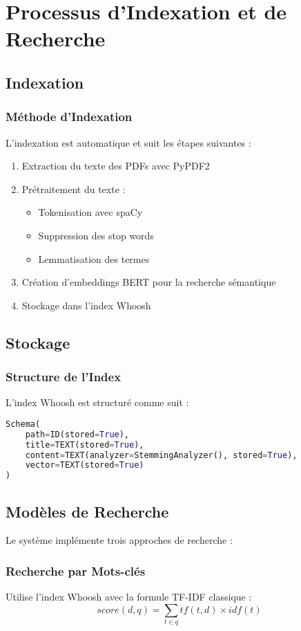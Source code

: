 \documentclass[12pt,a4paper]{article}
\begin{document}
\section{Processus d'Indexation et de Recherche}

\subsection{Indexation}
\subsubsection{Méthode d'Indexation}
L'indexation est automatique et suit les étapes suivantes :
\begin{enumerate}
    \item Extraction du texte des PDFs avec PyPDF2
    \item Prétraitement du texte :
    \begin{itemize}
        \item Tokenisation avec spaCy
        \item Suppression des stop words
        \item Lemmatisation des termes
    \end{itemize}
    \item Création d'embeddings BERT pour la recherche sémantique
    \item Stockage dans l'index Whoosh
\end{enumerate}

\subsection{Stockage}
\subsubsection{Structure de l'Index}
L'index Whoosh est structuré comme suit :
\begin{lstlisting}[language=Python]
Schema(
    path=ID(stored=True),
    title=TEXT(stored=True),
    content=TEXT(analyzer=StemmingAnalyzer(), stored=True),
    vector=TEXT(stored=True)
)
\end{lstlisting}

\subsection{Modèles de Recherche}
Le système implémente trois approches de recherche :

\subsubsection{Recherche par Mots-clés}
Utilise l'index Whoosh avec la formule TF-IDF classique :
\begin{equation}
    score(d,q) = \sum_{t \in q} tf(t,d) \times idf(t)
\end{equation}
\end{document}
